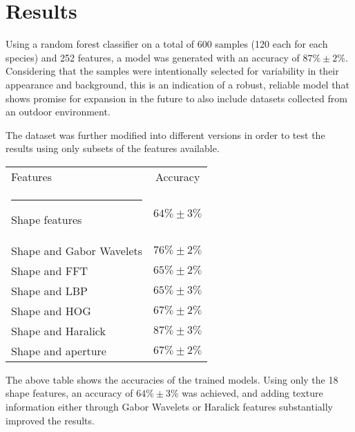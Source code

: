 \section{Results}

Using a random forest classifier on a total of 600 samples (120 each for each species) and 252 features, a model was generated with an accuracy of $87\% \pm 2\%$. Considering that the samples were intentionally selected for variability in their appearance and background, this is an indication of a robust, reliable model that shows promise for expansion in the future to also include datasets collected from an outdoor environment. 

The dataset was further modified into different versions in order to test the results using only subsets of the features available.

\begin{table}
        \begin{tabular}{ l c }
            Features & Accuracy \\ \hrule
            Shape features & $64\% \pm 3\%$ \\ 
            Shape and Gabor Wavelets & $76\% \pm 2\%$ \\ 
            Shape and FFT & $65\% \pm 2\%$ \\ 
            Shape and LBP & $65\% \pm 3\%$ \\ 
            Shape and HOG & $67\% \pm 2\%$ \\ 
            Shape and Haralick & $87\% \pm 3\%$ \\ 
            Shape and aperture & $67\% \pm 2\%$ \\ 
        \end{tabular} 
\end{table}

The above table shows the accuracies of the trained models. Using only the 18 shape features, an accuracy of $64\% \pm 3\%$ was achieved, and adding texture information either through Gabor Wavelets or Haralick features substantially improved the results.

  
  
  
  
  
  
  
  
  
  
  
